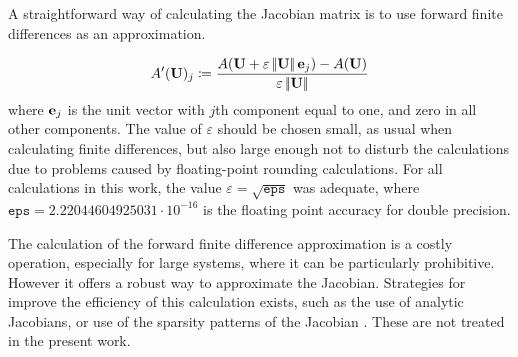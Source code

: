 A straightforward way of calculating the Jacobian matrix is to use forward finite differences as an approximation.

\begin{equation}
	A'(\textbf{U})_j \coloneqq \frac{A(\textbf{U}+\varepsilon\left|\!\left| {\textbf{U}} \right|\!\right|\textbf{e}_j )-A(\textbf{U})  }{\varepsilon\left|\!\left| {\textbf{U}} \right|\!\right|}
\end{equation}
where $\textbf{e}_j$ is the unit vector with $j$th component equal to one, and zero in all other components. The value of $\varepsilon$ should be chosen small, as usual when calculating finite differences, but also large enough not to disturb the calculations due to problems caused by floating-point rounding calculations.  For all calculations in this work, the value $\varepsilon = \sqrt{\mathtt{eps}}$ was adequate, where $\mathtt{eps} = 2.22044604925031 \cdot 10^{-16}$ is the floating point accuracy for double precision.

The calculation of the forward finite difference approximation is a costly operation, especially for large systems, where it can be particularly prohibitive. However it offers a robust way to approximate the Jacobian. Strategies for improve the efficiency of this calculation exists, such as the use of analytic Jacobians, or use of the sparsity patterns of the Jacobian \parencite{kelleyIterativeMethodsLinear1995}. These are not treated in the present work. 
